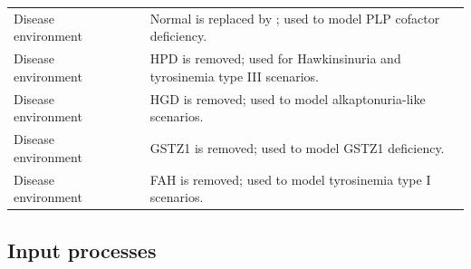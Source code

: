 \begin{xltabular}{\textwidth}{@{}L{0.17\textwidth} L{0.18\textwidth} Y L{0.25\textwidth}@{}}
Disease environment
& 
& 
& Normal  is replaced by ; used to model PLP cofactor deficiency. \\

Disease environment
& 
& 
& HPD is removed; used for Hawkinsinuria and tyrosinemia type III scenarios. \\

Disease environment
& 
& 
& HGD is removed; used to model alkaptonuria-like scenarios. \\

Disease environment
& 
& 
& GSTZ1 is removed; used to model GSTZ1 deficiency. \\

Disease environment
& 
& 
& FAH is removed; used to model tyrosinemia type I scenarios. \\

\end{xltabular}

\endgroup




\FloatBarrier

\subsection{Input processes}
\label{app:maude_input_processes_section}

\begingroup
\scriptsize
\setlength{\tabcolsep}{3pt}
\renewcommand{\arraystretch}{1.15}

